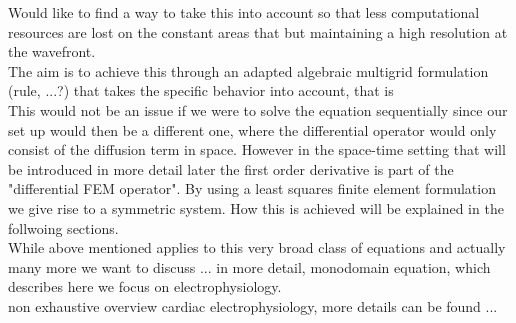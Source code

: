 \documentclass[../draft_1.tex]{subfiles}
\begin{document}
Would like to find a way to take this into account so that less computational resources are lost on the constant areas that but maintaining a high resolution at the wavefront. 
\smallskip
\\
The aim is to achieve this through an adapted algebraic multigrid formulation (rule, ...?) that takes the specific behavior into account, that is 
\smallskip
\\
This would not be an issue if we were to solve the equation sequentially since our set up would then be a different one, where the differential operator would only consist of the diffusion term in space. However in the space-time setting that will be introduced in more detail later the first order derivative is part of the "differential FEM operator". By using a least squares finite element formulation we give rise to a symmetric system. How this is achieved will be explained in the follwoing sections.   
\\

While above mentioned applies to this very broad class of equations and actually many more we want to discuss  ... in more detail, monodomain equation, which describes  
here we focus on electrophysiology. \\ 



non exhaustive overview cardiac electrophysiology, more details can be found ...
\smallskip
\\
\end{document}
